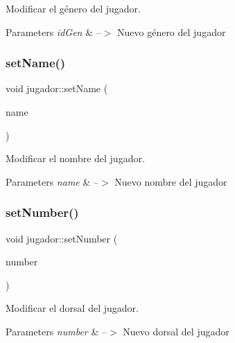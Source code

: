 Modificar el género del jugador. 


\begin{DoxyParams}{Parameters}
{\em id\+Gen} & --$>$ Nuevo género del jugador \\
\hline
\end{DoxyParams}
\mbox{\label{classjugador_a0dcf58840f95ad87661987f7750c4355}} 
\subsubsection{\texorpdfstring{set\+Name()}{setName()}}
{\footnotesize\ttfamily void jugador\+::set\+Name (\begin{DoxyParamCaption}\item[{Q\+String}]{name }\end{DoxyParamCaption})}



Modificar el nombre del jugador. 


\begin{DoxyParams}{Parameters}
{\em name} & --$>$ Nuevo nombre del jugador \\
\hline
\end{DoxyParams}
\mbox{\label{classjugador_aa393b3dfb2eb1f269e66eb0b9e673973}} 
\subsubsection{\texorpdfstring{set\+Number()}{setNumber()}}
{\footnotesize\ttfamily void jugador\+::set\+Number (\begin{DoxyParamCaption}\item[{int}]{number }\end{DoxyParamCaption})}



Modificar el dorsal del jugador. 


\begin{DoxyParams}{Parameters}
{\em number} & --$>$ Nuevo dorsal del jugador \\
\hline
\end{DoxyParams}
\mbox{\label{classjugador_aaa04ccc1da6c45dea35b723a54e217d4}} 
